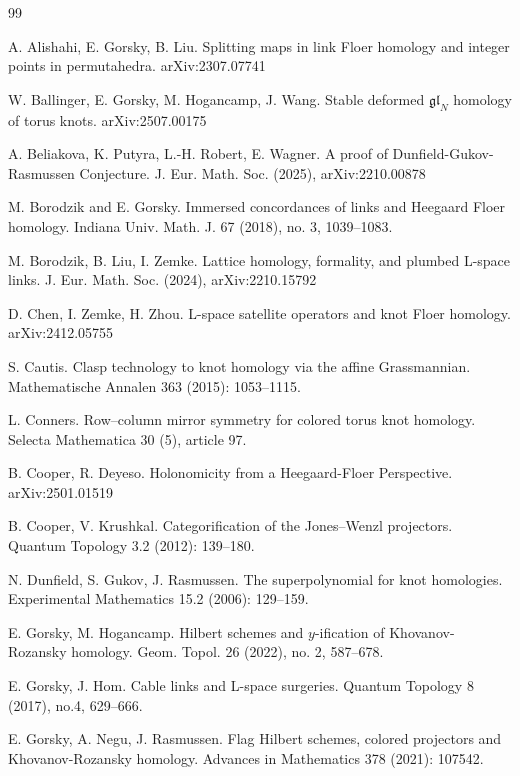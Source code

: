 \documentclass[10pt,a4paper]{amsart}
\begin{document}
\begin{thebibliography}{99}

 A. Alishahi, E. Gorsky, B. Liu. Splitting maps in link Floer homology and integer points in permutahedra. arXiv:2307.07741

 W. Ballinger, E. Gorsky, M. Hogancamp, J. Wang. Stable deformed $\mathfrak{gl}_N$ homology of torus knots. arXiv:2507.00175


  A. Beliakova, K. Putyra, L.-H. Robert, E. Wagner. A proof of Dunfield-Gukov-Rasmussen Conjecture. J. Eur. Math. Soc. (2025), arXiv:2210.00878

 M. Borodzik and E. Gorsky. Immersed concordances of links and Heegaard Floer homology. Indiana Univ. Math. J. 67 (2018), no. 3, 1039--1083. 



 M. Borodzik, B. Liu, I. Zemke. Lattice homology, formality,  and plumbed L-space links.  J. Eur. Math. Soc. (2024), arXiv:2210.15792

 D. Chen, I. Zemke, H. Zhou. L-space satellite operators and knot Floer homology. arXiv:2412.05755

 S. Cautis. Clasp technology to knot homology via the affine Grassmannian. Mathematische Annalen 363 (2015): 1053--1115.

 L. Conners. Row--column mirror symmetry for colored torus knot homology.
Selecta Mathematica 30 (5), article 97.

 B. Cooper, R. Deyeso.  Holonomicity from a Heegaard-Floer Perspective. arXiv:2501.01519

 B. Cooper, V. Krushkal. Categorification of the Jones--Wenzl projectors. Quantum Topology 3.2 (2012): 139--180.

 N. Dunfield, S. Gukov, J. Rasmussen. The superpolynomial for knot homologies. Experimental Mathematics 15.2 (2006): 129--159.

 E. Gorsky, M. Hogancamp. Hilbert schemes and  $y$-ification of Khovanov-Rozansky homology.
Geom. Topol. 26 (2022), no. 2, 587--678.

 E. Gorsky, J. Hom. Cable links and L-space surgeries.  
Quantum Topology 8 (2017), no.4, 629--666.

 E. Gorsky, A. Negu, J. Rasmussen. Flag Hilbert schemes, colored projectors and Khovanov-Rozansky homology. Advances in Mathematics 378 (2021): 107542.


\end{thebibliography}
\end{document}
